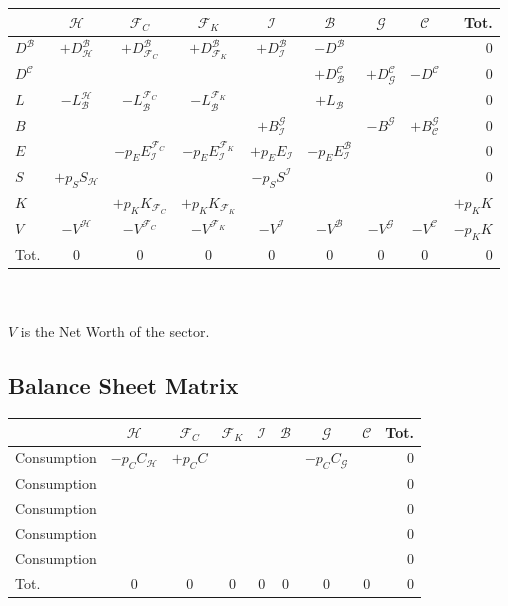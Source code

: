 \documentclass[a4paper, headings=standardclasses]{scrartcl}
\begin{document}
\begin{tabular}{l|ccccccc|r}
	\toprule
	& $\mathcal{H}$ & $\mathcal{F}_C$ & $\mathcal{F}_K$ & $\mathcal{I}$ & $\mathcal{B}$ & $\mathcal{G}$ & $\mathcal{C}$ & Tot. \\
	\midrule
	$D^\mathcal{B}$ & $+D^\mathcal{B}_\mathcal{H}$ & $+D^\mathcal{B}_{\mathcal{F}_C}$ & $+D^\mathcal{B}_{\mathcal{F}_K}$ &  $+D^\mathcal{B}_\mathcal{I}$  &  $-D^\mathcal{B}$ & & & 0 \\
	$D^\mathcal{C}$ & & & & & $+D^\mathcal{C}_\mathcal{B}$ & $+D^\mathcal{C}_\mathcal{G}$ & $-D^\mathcal{C}$ & 0 \\
	$L$ & $-L^\mathcal{H}_\mathcal{B}$ & $-L^{\mathcal{F}_C}_\mathcal{B}$ & $-L^{\mathcal{F}_K}_\mathcal{B}$ & & $+L_\mathcal{B}$ & & & 0 \\
	$B$ & & & & $+B^\mathcal{G}_\mathcal{I}$ & & $-B^\mathcal{G}$ & $+B^\mathcal{G}_\mathcal{C}$ & 0 \\
	$E$ & & $-p_E E^{\mathcal{F}_C}_\mathcal{I}$ & $-p_E E^{\mathcal{F}_K}_\mathcal{I}$ & $+p_E E_\mathcal{I}$ & $-p_E E^\mathcal{B}_\mathcal{I}$ & & & 0 \\
	$S$ & $+p_S S_\mathcal{H}$ & & & $-p_S S^\mathcal{I}$ & & & & 0 \\
	$K$ & & $+p_K K_{\mathcal{F}_C}$ & $+p_K K_{\mathcal{F}_K}$ & & & & & $+p_K K$\\
	$V$ & $-V^\mathcal{H}$ & $-V^{\mathcal{F}_C}$ & $-V^{\mathcal{F}_K}$ & $-V^\mathcal{I}$ & $-V^\mathcal{B}$ & $-V^\mathcal{G}$ & $-V^\mathcal{C}$ & $-p_K K$\\
	\midrule
	Tot. & 0 & 0 & 0 & 0 & 0 & 0 & 0 & 0 \\
	\bottomrule
\end{tabular}
\\ \\ 
\vspace{1em}
$V$ is the Net Worth of the sector.

\subsection{Balance Sheet Matrix}

\begin{tabular}{l|ccccccc|r}
	\toprule
	& $\mathcal{H}$ & $\mathcal{F}_C$ & $\mathcal{F}_K$ & $\mathcal{I}$ & $\mathcal{B}$ & $\mathcal{G}$ & $\mathcal{C}$ & Tot. \\
	\midrule
	Consumption & $-p_C C_\mathcal{H}$ & $+p_C C$ & & & & $-p_C C_\mathcal{G}$ & & 0 \\
	Consumption & & & & & & & & 0 \\
	Consumption & & & & & & & & 0 \\
	Consumption & & & & & & & & 0 \\
	Consumption & & & & & & & & 0 \\
	\midrule
	Tot. & 0 & 0 & 0 & 0 & 0 & 0 & 0 & 0 \\
	\bottomrule
\end{tabular}
\\ \\ 
\vspace{1em}
\end{document}
